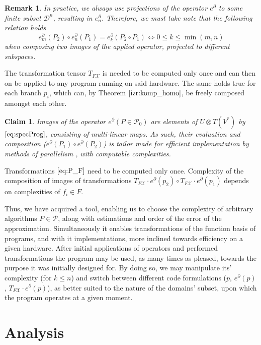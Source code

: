 \documentclass{article}
\newcommand{\X}{\mathcal{X}}
\newcommand{\dP}{\mathcal{P}}
\newcommand{\D}{\partial}
\newcommand{\DD}{\mathcal{D}}
\newtheorem{trditev}{Claim}[section]
\newtheorem{opomba}{Remark}[section]
\begin{document}
\begin{opomba}
In practice, we always use projections of the operator $e^\D$ to some finite subset $\DD^n$, resulting in $e^\D_n$. Therefore, we must take note that the following relation holds
\begin{equation}
e^\D_m(P_2)\circ e^\D_n(P_1)=e^\D_k(P_2\circ P_1)\iff 0\le k\le \min(m,n)
\end{equation}
when composing two images of the applied operator, projected to different subspaces.
\end{opomba}

The transformation tensor $T_{F\X}$ is needed to be computed only once and can then on be applied to any program running on said hardware. The same holds true for each branch $p_i$, which can, by Theorem $\ref{izr:komp_homo}$, be freely composed amongst each other.

\begin{trditev}
Images of the operator $e^\D (P\in\dP_0)$ are elements of $U\otimes T(V^*)$ by $\eqref{eq:specProg}$, consisting of multi-linear maps. As such, their evaluation and composition ($e^\D(P_1)\circ e^\D(P_2)$) is tailor made for efficient implementation by methods of parallelism \cite{TensorGPU}, with computable complexities.
\end{trditev}

Transformations $\eqref{eq:P_F}$ need to be computed only once. Complexity of the composition of images of transformations $T_{F\X}\cdot e^\D(p_2)\circ T_{F\X}\cdot e^\D(p_1)$ depends on complexities of $f_i\in F$.

Thus, we have acquired a tool, enabling us to choose the complexity of arbitrary algorithms $P\in\dP$, along with estimations and order of the error of the approximation. Simultaneously it enables transformations of the function basis of programs, and with it implementations, more inclined towards efficiency on a given hardware. After initial applications of operators and performed transformations the program may be used, as many times as pleased, towards the purpose it was initially designed for. By doing so, we may manipulate its' complexity (for $k\le n$) and switch between different code formulations ($p$, $e^\D(p)$, $T_{F\X}\cdot e^\D(p)$), as better suited to the nature of the domains' subset, upon which the program operates at a given moment.
  
\section{Analysis}\label{sec:Analysis}
  
\end{document}
